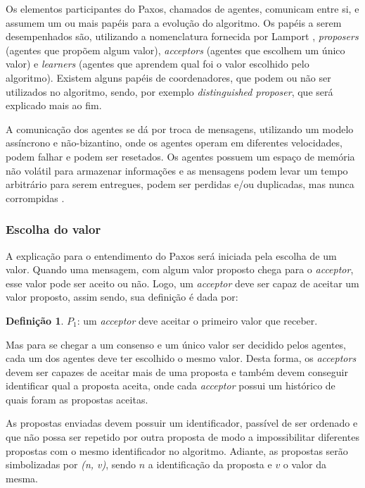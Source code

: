 \documentclass[
    12pt,
    openright, 
    oneside,
    a4paper,
    french,
    english,
    brazil
    ]{facom-ufu-abntex2}
\theoremstyle{definition}
\newtheorem{definition}{Definição}
\begin{document}
Os elementos participantes do Paxos, chamados de agentes, comunicam entre si, e assumem 
um ou mais papéis para a evolução do algoritmo. Os papéis a serem desempenhados são, 
utilizando a nomenclatura fornecida por Lamport \cite{lamport2001paxos}, 
\textit{proposers} (agentes que propõem algum valor), \textit{acceptors} 
(agentes que escolhem um único valor) e \textit{learners} (agentes que aprendem
qual foi o valor escolhido pelo algoritmo).
Existem alguns papéis de coordenadores, que podem ou não ser utilizados no algoritmo, 
sendo, por exemplo \textit{distinguished proposer}, que será explicado mais ao fim.

A comunicação dos agentes se dá por troca de mensagens, utilizando um modelo assíncrono e
não-bizantino, onde os agentes operam em diferentes velocidades, podem falhar e podem ser
resetados. Os agentes possuem um espaço de memória não volátil para armazenar informações e
as mensagens podem levar um tempo arbitrário para serem entregues, podem ser perdidas e/ou 
duplicadas, mas nunca corrompidas \cite{lamport2001paxos}.

\subsubsection{Escolha do valor}
A explicação para o entendimento do Paxos será iniciada pela escolha de um valor. 
Quando uma mensagem, com algum valor proposto chega para o \textit{acceptor}, esse valor pode 
ser aceito ou não. Logo, um \textit{acceptor} deve ser capaz de aceitar um valor proposto, 
assim sendo, sua definição é dada por:

\begin{definition}
$P_1$: um \textit{acceptor} deve aceitar o primeiro valor que receber.
\end{definition}

Mas para se chegar a um consenso e um único valor ser decidido pelos agentes, cada um
dos agentes deve ter escolhido o mesmo valor. Desta forma, os \textit{acceptors} devem
ser capazes de aceitar mais de uma proposta e também devem conseguir identificar qual
a proposta aceita, onde cada \textit{acceptor} possui um histórico de quais foram as
propostas aceitas.

As propostas enviadas devem possuir um identificador, passível de ser ordenado e que não 
possa ser repetido por outra proposta de modo a impossibilitar diferentes propostas com o mesmo
identificador no algoritmo. Adiante, as propostas serão simbolizadas por 
\textit{(n, v)}, sendo $n$ a identificação da proposta e $v$ o valor da mesma.
\end{document}
